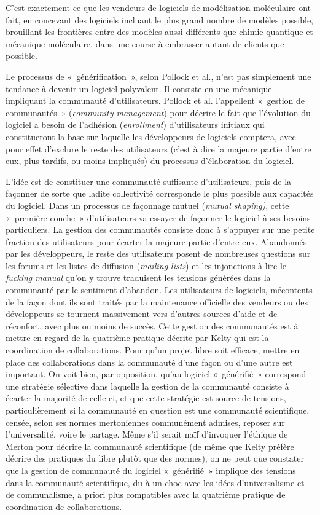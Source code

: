 \documentclass{FramateX}
\begin{document}
\begin{refsection}
C'est exactement ce que les vendeurs de logiciels de
modélisation moléculaire ont fait, en concevant des logiciels
incluant le plus grand nombre de modèles possible, brouillant les
frontières entre des modèles aussi différents que chimie quantique et
mécanique moléculaire, dans une course à embrasser autant de clients
que possible.

Le processus de «~générification~», selon Pollock et al.,
n'est pas simplement une tendance à devenir un
logiciel polyvalent. Il consiste en une mécanique impliquant la
communauté d'utilisateurs. Pollock et al.
l'appellent «~gestion de communautés~»
(\textit{community management}) pour décrire le fait que
l'évolution du logiciel a besoin de
l'adhésion (\textit{enrollment})
d'utilisateurs initiaux qui constitueront la base sur
laquelle les développeurs de logiciels comptera, avec pour effet
d'exclure le reste des utilisateurs
(c'est à dire la majeure partie
d'entre eux, plus tardifs, ou moins impliqués) du
processus d'élaboration du logiciel.

L'idée est de constituer une communauté suffisante
d'utilisateurs, puis de la façonner de sorte que
ladite collectivité corresponde le plus possible aux capacités du
logiciel. Dans un processus de façonnage mutuel (\textit{mutual
shaping)}, cette «~première couche~» d'utilisateurs va
essayer de façonner le logiciel à ses besoins particuliers. La gestion
des communautés consiste donc à s'appuyer sur une
petite fraction des utilisateurs pour écarter la majeure partie
d'entre eux. Abandonnés par les développeurs, le reste
des utilisateurs posent de nombreuses questions sur les forums et les
listes de diffusion (\textit{mailing lists}) et les injonctions à lire
le \textit{fucking manual} qu'on y trouve
traduisent les tensions générées dans la communauté par le sentiment
d'abandon. Les utilisateurs de logiciels, mécontents
de la façon dont ils sont traités par la maintenance officielle des
vendeurs ou des développeurs se tournent massivement vers
d'autres sources d'aide et de
réconfort\ldots avec plus ou moins de succès. Cette gestion des
communautés est à mettre en regard de la quatrième pratique décrite par
Kelty qui est la coordination de collaborations. Pour
qu'un projet libre soit efficace, mettre en place des
collaborations dans la communauté d'une façon ou
d'une autre est important. On voit bien, par
opposition, qu'au logiciel «~générifié~» correspond
une stratégie sélective dans laquelle la gestion de la communauté
consiste à écarter la majorité de celle ci, et que cette stratégie est
source de tensions, particulièrement si la communauté en question est
une communauté scientifique, censée, selon ses normes mertoniennes
communément admises, reposer sur l'universalité, voire
le partage. Même s'il serait naïf
d'invoquer l'éthique de Merton pour
décrire la communauté scientifique (de même que Kelty préfère décrire
des pratiques du libre plutôt que des normes), on ne peut que constater
que la gestion de communauté du logiciel «~générifié~» implique des
tensions dans la communauté scientifique, du à un choc avec les idées
d'universalisme et de communalisme, a priori plus
compatibles avec la quatrième pratique de coordination de
collaborations. 


\end{refsection}
\end{document}
